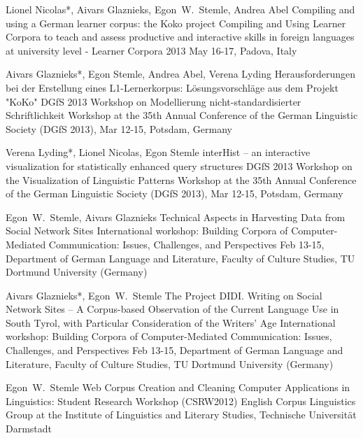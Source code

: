 \documentclass[11pt,a4paper]{moderncv}
\begin{document}
        {Lionel Nicolas*, Aivars Glaznieks, Egon~W.~Stemle, Andrea Abel}
        {\small Compiling and using a German learner corpus: the Koko project}
        {\small Compiling and Using Learner Corpora to teach and assess
        productive and interactive skills in foreign languages at university
        level - Learner Corpora 2013}
        {\small May 16-17, Padova, Italy}
        {}

        {Aivars Glaznieks*, Egon Stemle, Andrea Abel, Verena Lyding}
        {\small Herausforderungen bei der Erstellung eines L1-Lernerkorpus:
        Lösungsvorschläge aus dem Projekt "KoKo"}
        {\small DGfS 2013 Workshop on Modellierung nicht-standardisierter
        Schriftlichkeit}
        {\small Workshop at the 35th Annual Conference of the German Linguistic
        Society (DGfS 2013), Mar 12-15, Potsdam, Germany}
        {}

        {Verena Lyding*, Lionel Nicolas, Egon Stemle}
        {\small interHist -- an interactive visualization for statistically
        enhanced query structures}
        {\small DGfS 2013 Workshop on the Visualization of Linguistic Patterns}
        {\small Workshop at the 35th Annual Conference of the German Linguistic
        Society (DGfS 2013), Mar 12-15, Potsdam, Germany}
        {}

        {Egon~W.~Stemle, Aivars Glaznieks}
        {\small Technical Aspects in Harvesting Data from Social Network Sites}
        {\small International workshop: Building Corpora of Computer-Mediated
        Communication: Issues, Challenges, and Perspectives}
        {\small Feb 13-15, Department of German Language and Literature, Faculty of
        Culture Studies, TU Dortmund University (Germany)}
        {}

        {Aivars Glaznieks*, Egon~W.~Stemle}
        {\small The Project DIDI. Writing on Social Network Sites -- A
        Corpus-based Observation of the Current Language Use in South Tyrol,
        with Particular Consideration of the Writers’ Age} 
        {\small International workshop: Building Corpora of Computer-Mediated
        Communication: Issues, Challenges, and Perspectives}
        {\small Feb 13-15, Department of German Language and Literature, Faculty of
        Culture Studies, TU Dortmund University (Germany)}
        {}

        {Egon~W.~Stemle}
        {Web Corpus Creation and Cleaning}
        {\small Computer Applications in Linguistics: Student Research Workshop (CSRW2012)}
        {\small English Corpus Linguistics Group at the Institute of
        Linguistics and Literary Studies, Technische Universit\"{a}t Darmstadt}
        {}
\end{document}
